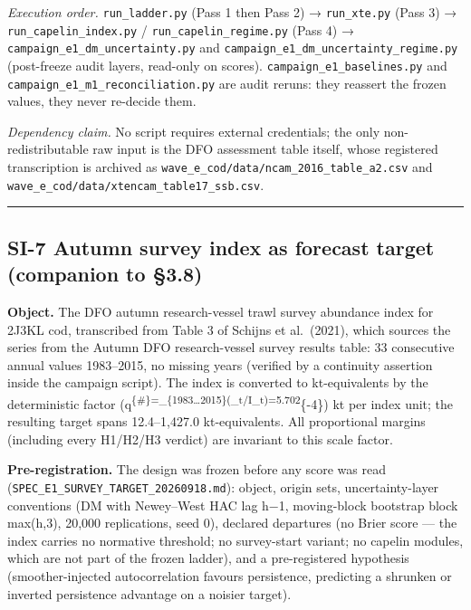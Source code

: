 \documentclass[11pt]{article}
\begin{document}
\emph{Execution order.} \texttt{run\_ladder.py} (Pass 1 then Pass 2) →
\texttt{run\_xte.py} (Pass 3) → \texttt{run\_capelin\_index.py} /
\texttt{run\_capelin\_regime.py} (Pass 4) →
\texttt{campaign\_e1\_dm\_uncertainty.py} and
\texttt{campaign\_e1\_dm\_uncertainty\_regime.py} (post-freeze audit
layers, read-only on scores). \texttt{campaign\_e1\_baselines.py} and
\texttt{campaign\_e1\_m1\_reconciliation.py} are audit reruns: they
reassert the frozen values, they never re-decide them.

\emph{Dependency claim.} No script requires external credentials; the
only non-redistributable raw input is the DFO assessment table itself,
whose registered transcription is archived as
\texttt{wave\_e\_cod/data/ncam\_2016\_table\_a2.csv} and
\texttt{wave\_e\_cod/data/xtencam\_table17\_ssb.csv}.

\begin{center}\rule{0.5\linewidth}{0.5pt}\end{center}

\subsection{SI-7 Autumn survey index as forecast target (companion to
§3.8)}\label{si-7-autumn-survey-index-as-forecast-target-companion-to-3.8}

\textbf{Object.} The DFO autumn research-vessel trawl survey abundance
index for 2J3KL cod, transcribed from Table 3 of Schijns et al.~(2021),
which sources the series from the Autumn DFO research-vessel survey
results table: 33 consecutive annual values 1983--2015, no missing years
(verified by a continuity assertion inside the campaign script). The
index is converted to kt-equivalents by the deterministic factor
(q\textsuperscript{\{\#\}=\_\{1983\dots2015\}(\_t/I\_t)=5.702}\{-4\})
kt per index unit; the resulting target spans 12.4--1,427.0
kt-equivalents. All proportional margins (including every H1/H2/H3
verdict) are invariant to this scale factor.

\textbf{Pre-registration.} The design was frozen before any score was
read (\texttt{SPEC\_E1\_SURVEY\_TARGET\_20260918.md}): object, origin
sets, uncertainty-layer conventions (DM with Newey--West HAC lag h−1,
moving-block bootstrap block max(h,3), 20,000 replications, seed 0),
declared departures (no Brier score --- the index carries no normative
threshold; no survey-start variant; no capelin modules, which are not
part of the frozen ladder), and a pre-registered hypothesis
(smoother-injected autocorrelation favours persistence, predicting a
shrunken or inverted persistence advantage on a noisier target).
\end{document}
